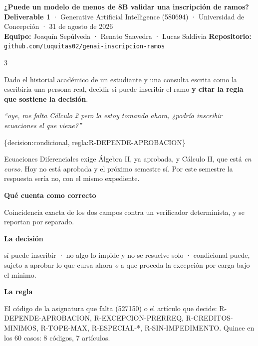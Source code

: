 \documentclass[9pt,a4paper,landscape]{extarticle}
\newcommand{\seccion}[1]{\vspace{1.0mm}{\bfseries\footnotesize\color{acento}\MakeUppercase{#1}}\par\nobreak\vspace{0.4mm}\nobreak}
\newcommand{\sub}[1]{{\bfseries #1}\par\nobreak\vspace{-1.3mm}\nobreak}
\newcommand{\q}{\textquotedbl}   %
\newcommand{\cod}[1]{{\ttfamily\small #1}}
\newcommand{\destaque}[1]{%
  \begingroup\setlength{\fboxsep}{2.2mm}%
  \colorbox{fondo}{\parbox{\dimexpr\columnwidth-4.4mm\relax}{#1}}%
  \endgroup\par}
\begin{document}
\raggedright

{\LARGE\bfseries ¿Puede un modelo de menos de 8B validar una inscripción de ramos?}\\[1mm]
{\footnotesize\color{gris}%
\textbf{Deliverable 1} · Generative Artificial Intelligence (580694) · Universidad de Concepción · 31 de agosto de 2026\\
\textbf{Equipo:} Joaquín Sepúlveda · Renato Saavedra · Lucas Saldivia \quad\textbullet\quad
\textbf{Repositorio:} \texttt{github.com/Luquitas02/genai-inscripcion-ramos}}

\vspace{1mm}{\color{linea}\rule{\textwidth}{0.9pt}}

\begin{multicols}{3}

\seccion{La tarea}

Dado el historial académico de un estudiante y una consulta escrita como la
escribiría una persona real, decidir si puede inscribir el ramo \textbf{y citar
la regla que sostiene la decisión}.

\destaque{\small\itshape
``oye, me falta Cálculo 2 pero la estoy tomando ahora, ¿podría inscribir
ecuaciones el que viene?''\par\vspace{1.2mm}
\normalfont\ttfamily\scriptsize
\{\q decision\q:\q condicional\q, \q regla\q:\q R-DEPENDE-APROBACION\q\}}

\vspace{0.5mm}
Ecuaciones Diferenciales exige Álgebra II, ya aprobada, y Cálculo II, que está
\emph{en curso}. Hoy no está aprobada y el próximo semestre sí. Por este
semestre la respuesta sería \cod{no}, con el mismo expediente.

\vspace{0.5mm}
\sub{Qué cuenta como correcto}
Coincidencia exacta de los dos campos contra un verificador determinista, y se
reportan por separado.

\vspace{0.5mm}
\sub{La decisión}
\cod{sí} puede inscribir · \cod{no} algo lo impide y no se resuelve solo ·
\cod{condicional} puede, sujeto a aprobar lo que cursa ahora \emph{o} a que
proceda la excepción por carga bajo el mínimo.

\vspace{0.5mm}
\sub{La regla}
El código de la asignatura que falta (\cod{527150}) o el artículo que decide:
\cod{R-DEPENDE-APROBACION}, \cod{R-EXCEPCION-PRERREQ},
\cod{R-CREDITOS-MINIMOS}, \cod{R-TOPE-MAX}, \cod{R-ESPECIAL-*},
\cod{R-SIN-IMPEDIMENTO}. Quince en los 60 casos: 8 códigos, 7 artículos.


\end{multicols}
\end{document}
